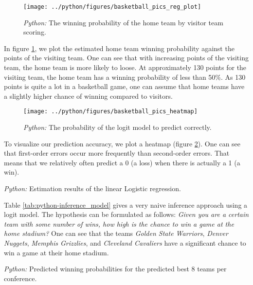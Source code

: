 \documentclass[11pt, a4paper, leqno]{article}
\begin{document}
\begin{figure}[H]
\centering
\caption{\emph{Python:} The winning probability of the home team by visitor team scoring.}
\texttt{[image: ../python/figures/basketball\_pics\_reg\_plot]}
    \label{fig:python-reg_plot}

\end{figure}

In figure \ref{fig:python-reg_plot}, we plot the estimated home team winning probability against the points of the visiting team. One can see that with increasing points of the visiting team, the home team is more likely to loose.
At approximately 130 points for the visiting team, the home team has a winning probability of less than 50\%. As 130 points is quite a lot in a basketball game, one can assume that home teams have a slightly higher chance of winning compared to visitors.


\begin{figure}[H]

    \centering
    \caption{\emph{Python:} The probability of the logit model to predict correctly.}
    \texttt{[image: ../python/figures/basketball\_pics\_heatmap]}
    \label{fig:python-heatmap}

\end{figure}

To visualize our prediction accuracy, we plot a heatmap (figure \ref{fig:python-heatmap}). One can see that first-order errors occur more frequently than second-order errors. That means that we relatively often predict a 0 (a loss) when there is actually a 1 (a win).

\begin{table}[H]
    \caption{\label{tab:python-inference_model}\emph{Python:} Estimation results of the
    linear Logistic regression.}
    
\end{table}

Table \ref{tab:python-inference_model} gives a very naive inference approach using a logit model. The hypothesis can be formulated as follows: \textit{Given you are a certain team with some number of wins, how high is the chance to win a game at the home stadium?} One can see that the teams \textit{Golden State Warriors}, \textit{Denver Nuggets}, \textit{Memphis Grizzlies}, and \textit{Cleveland Cavaliers} have a significant chance to win a game at their home stadium.\\

\begin{table}[H]
    \caption{\label{tab:python-table_playoffs}\emph{Python:} Predicted winning probabilities for the predicted best 8 teams per conference.}
    
\end{table}
\end{document}
